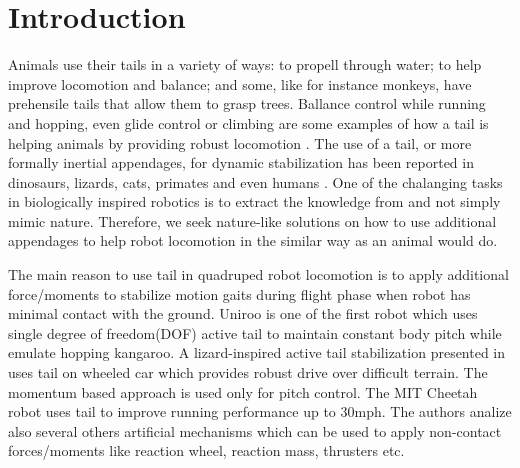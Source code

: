 \section{Introduction}\label{sec:introduction}

Animals use their tails in a variety of ways: to propell through water; to help improve locomotion and balance; and some, like for instance monkeys, have prehensile tails that allow them to grasp trees. Ballance control while running and hopping, even glide control or climbing are some examples of how a tail is helping animals by providing robust locomotion \cite{Thomas:Nature2012}. The use of a tail, or more formally inertial appendages, for dynamic stabilization has been reported in dinosaurs, lizards, cats, primates and even humans \cite{ostrom1969osteology,PijnappelsSringer,Walker199841,JusufiIOP2010}. One of the chalanging tasks in biologically inspired robotics is to extract the knowledge from and not simply mimic nature. Therefore, we seek nature-like solutions on how to use additional appendages to help robot locomotion in the similar way as an animal would do.  

The main reason to use tail in quadruped robot locomotion is to apply additional force/moments to stabilize motion gaits during flight phase when robot has minimal contact with the ground. Uniroo \cite{zeglin1991uniroo} is one of the first robot which uses single degree of freedom(DOF) active tail to maintain constant body pitch while emulate hopping kangaroo. A lizard-inspired active tail stabilization presented in \cite{conf/iros/Chang-SiuLTF11} uses tail on wheeled car which provides robust drive over difficult terrain. The momentum based approach is used only for pitch control. The MIT Cheetah robot \cite{DBLP:conf/iros/BriggsLHK12} uses tail to improve running performance up to 30mph. The authors analize also several others artificial mechanisms which can be used to apply non-contact forces/moments like reaction wheel, reaction mass, thrusters etc. 

